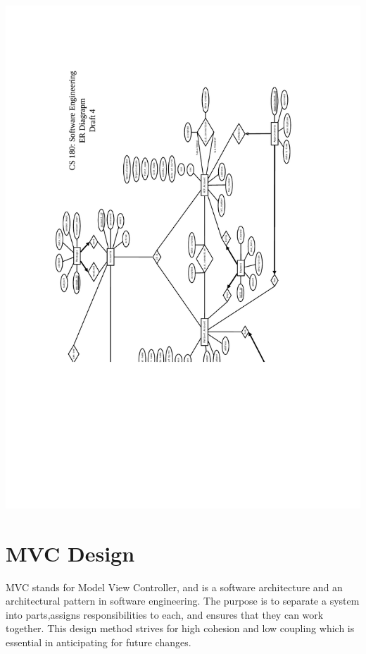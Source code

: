 \documentclass[12pt]{report}
\begin{document}
\includegraphics[scale=0.6,angle=180]{cs180_ER_draft4.pdf}

\section{MVC Design}

MVC stands for Model View Controller, and is a software architecture and an architectural pattern in software engineering. The purpose is to separate a system into parts,assigns responsibilities to each, and ensures that they can work together. This design method strives for high cohesion and low coupling which is essential in anticipating for future changes.
\end{document}

